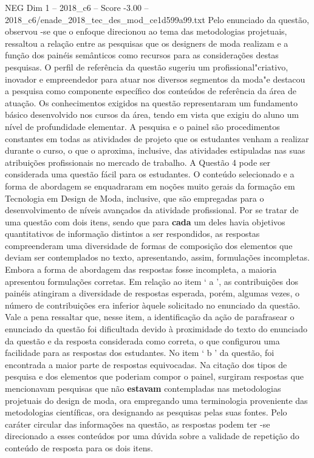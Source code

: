 \begin{textsample}{NEG Dim 1 – 2018\_c6 – Score -3.00 – 2018\_c6/enade\_2018\_tec\_des\_mod\_ce1d599a99.txt}
Pelo enunciado da questão, observou -se que o enfoque direcionou ao tema das metodologias projetuais, ressaltou a relação entre as pesquisas que os designers de moda realizam e a função dos painéis semânticos como recursos para as considerações destas pesquisas.
O perfil de referência da questão sugeriu um profissional"criativo, inovador e empreendedor para atuar nos diversos segmentos da moda"e destacou a pesquisa como componente específico dos conteúdos de referência da área de atuação.
Os conhecimentos exigidos na questão representaram um fundamento básico desenvolvido nos cursos da área, tendo em vista que exigiu do aluno um nível de profundidade elementar.
A pesquisa e o painel são procedimentos constantes em todas as atividades de projeto que os estudantes venham a realizar durante o curso, o que o aproxima, inclusive, das atividades estipuladas nas suas atribuições profissionais no mercado de trabalho.
A Questão 4 pode ser considerada uma questão fácil para os estudantes.
O conteúdo selecionado e a forma de abordagem se enquadraram em noções muito gerais da formação em Tecnologia em Design de Moda, inclusive, que são empregadas para o desenvolvimento de níveis avançados da atividade profissional.
Por se tratar de uma questão com dois itens, sendo que para \textbf{cada} um deles havia objetivos quantitativos de informação distintos a ser respondidos, as respostas compreenderam uma diversidade de formas de composição dos elementos que deviam ser contemplados no texto, apresentando, assim, formulações incompletas.
Embora a forma de abordagem das respostas fosse incompleta, a maioria apresentou formulações corretas.
Em relação ao item ‘ a ’, as contribuições dos painéis atingiram a diversidade de respostas esperada, porém, algumas vezes, o número de contribuições era inferior àquele solicitado no enunciado da questão.
Vale a pena ressaltar que, nesse item, a identificação da ação de parafrasear o enunciado da questão foi dificultada devido à proximidade do texto do enunciado da questão e da resposta considerada como correta, o que configurou uma facilidade para as respostas dos estudantes.
No item ‘ b ’ da questão, foi encontrada a maior parte de respostas equivocadas.
Na citação dos tipos de pesquisa e dos elementos que poderiam compor o painel, surgiram respostas que mencionavam pesquisas que não \textbf{estavam} contempladas nas metodologias projetuais do design de moda, ora empregando uma terminologia proveniente das metodologias científicas, ora designando as pesquisas pelas suas fontes.
Pelo caráter circular das informações na questão, as respostas podem ter -se direcionado a esses conteúdos por uma dúvida sobre a validade de repetição do conteúdo de resposta para os dois itens.

\end{textsample}
